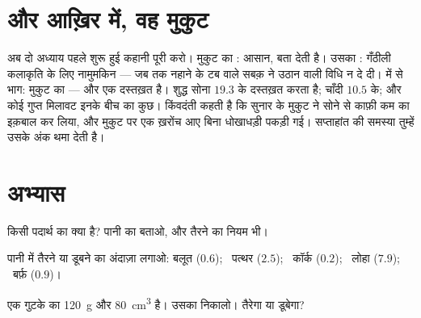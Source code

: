 \section{और आख़िर में, वह मुकुट}

\begin{example}[आर्किमिडीज़ मुक़दमा बंद करता है]\label{ex:g6:density-floating:crown}
अब दो अध्याय पहले शुरू हुई कहानी पूरी करो। मुकुट का : आसान,
 बता देती है। उसका : गँठीली कलाकृति के लिए नामुमकिन --- जब तक
नहाने के टब वाले सबक़ ने उठान वाली विधि न दे दी।  में 
से भाग: मुकुट का \emph{} --- और  एक दस्तख़त है। शुद्ध सोना
$19.3$ के दस्तख़त करता है; चाँदी $10.5$ के; और कोई गुप्त मिलावट इनके
बीच का कुछ। किंवदंती कहती है कि सुनार के मुकुट ने सोने से काफ़ी कम
 का इक़बाल कर लिया, और मुकुट पर एक ख़रोंच आए बिना धोखाधड़ी पकड़ी
गई। सप्ताहांत की समस्या तुम्हें उसके अंक थमा देती है।
\end{example}

\section{अभ्यास}

\begin{exercise}[$\star$]\label{exo:g6:density-floating:1}
किसी पदार्थ का  क्या है? पानी का  बताओ, और तैरने का नियम भी।
\end{exercise}

\begin{exercise}[$\star$]\label{exo:g6:density-floating:2}
पानी में तैरने या डूबने का अंदाज़ा लगाओ: बलूत ($0.6$); \ पत्थर
($2.5$); \ कॉर्क ($0.2$); \ लोहा ($7.9$); \ बर्फ़ ($0.9$)।
\end{exercise}

\begin{exercise}[$\star$]\label{exo:g6:density-floating:3}
एक गुटके का  \qty{120}{g} और  \qty{80}{cm^3} है। उसका
 निकालो। तैरेगा या डूबेगा?
\end{exercise}

